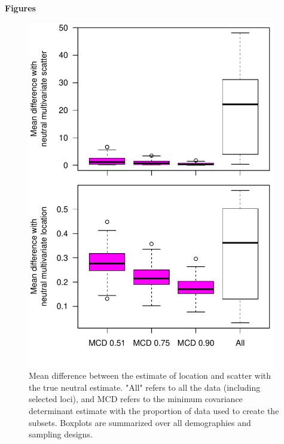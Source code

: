 \documentclass[12pt, oneside]{amsart}
\begin{document}


{ \Large \bf Figures}




\newpage
\begin{figure}[h]
\begin{center}
\includegraphics[height=6in]{../figures_man2/F1-LandsharcComparetoNeutlocationscatter.pdf}
\end{center}
\caption[]{ Mean difference between the estimate of location and scatter with the true neutral estimate. "All" refers to all the data (including selected loci), and MCD refers to the minimum covariance determinant estimate with the proportion of data used to create the subsets. Boxplots are summarized over all demographies and sampling designs.
} 
 \label{fig:???}
\end{figure}
\end{document}
